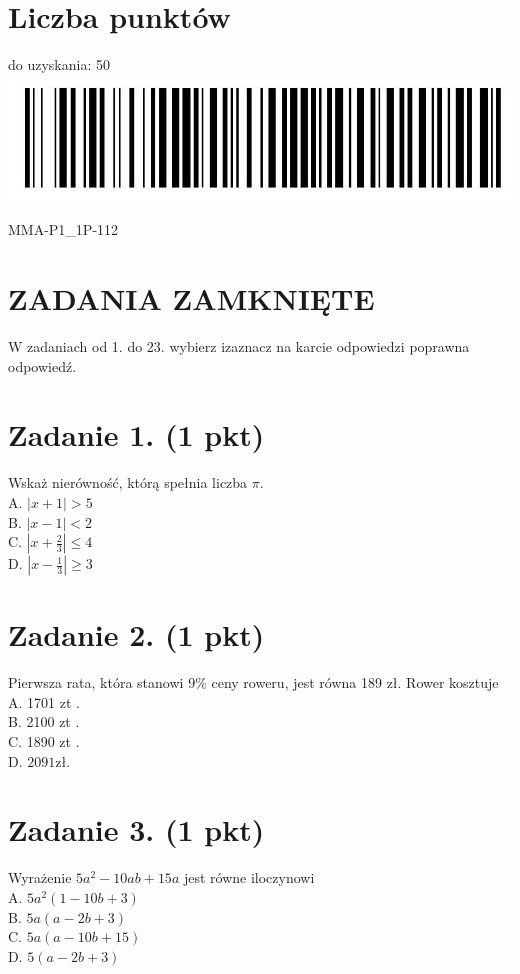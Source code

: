 \documentclass[10pt]{article}
\begin{document}
\section*{Liczba punktów}
do uzyskania: 50\\
\includegraphics[max width=\textwidth, center]{2024_11_21_5b6b7ffa9006e3f448adg-01}

MMA-P1\_1P-112

\section*{ZADANIA ZAMKNIĘTE}
W zadaniach od 1. do 23. wybierz izaznacz na karcie odpowiedzi poprawna odpowiedź.

\section*{Zadanie 1. (1 pkt)}
Wskaż nierówność, którą spełnia liczba \(\pi\).\\
A. \(|x+1|>5\)\\
B. \(|x-1|<2\)\\
C. \(\left|x+\frac{2}{3}\right| \leq 4\)\\
D. \(\left|x-\frac{1}{3}\right| \geq 3\)

\section*{Zadanie 2. (1 pkt)}
Pierwsza rata, która stanowi \(9 \%\) ceny roweru, jest równa 189 zł. Rower kosztuje\\
A. 1701 zt .\\
B. 2100 zt .\\
C. 1890 zt .\\
D. \(2091 \mathrm{zł}\).

\section*{Zadanie 3. (1 pkt)}
Wyrażenie \(5 a^{2}-10 a b+15 a\) jest równe iloczynowi\\
A. \(5 a^{2}(1-10 b+3)\)\\
B. \(5 a(a-2 b+3)\)\\
C. \(5 a(a-10 b+15)\)\\
D. \(5(a-2 b+3)\)
\end{document}
